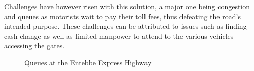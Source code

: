     Challenges have however risen with this solution, a major one being congestion and queues as motorists wait to pay their toll fees, thus defeating the road’s intended purpose. These challenges can be attributed to issues such as finding cash change as well as limited manpower to attend to the various vehicles accessing the gates\cite{bari_delay_2022}.
    \begin{figure}%
    \centering
    \qquad
    \caption{Queues at the Entebbe Express Highway}%
    \label{fig:example}%
\end{figure}

